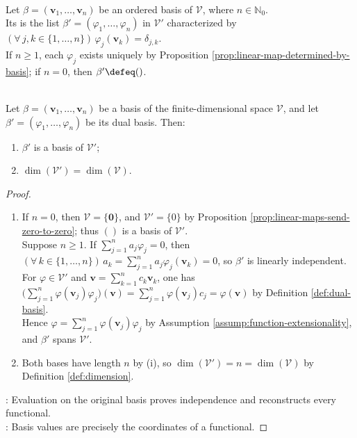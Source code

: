 \begin{definition} \label{def:dual-basis} \\
Let $\beta=(\mathbf{v}_1,\ldots,\mathbf{v}_n)$ be an ordered basis of $\mathcal{V}$, where $n\in\mathbb{N}_0$.\\
Its  is the list $\beta'=(\varphi_1,\ldots,\varphi_n)$ in $\mathcal{V}'$ characterized by $(\forall\,j,k\in\{1,\ldots,n\})\,\varphi_j(\mathbf{v}_k)=\delta_{j,k}$.\\
If $n\geq1$, each $\varphi_j$ exists uniquely by Proposition \ref{prop:linear-map-determined-by-basis}; if $n=0$, then $\beta'\defeq()$.
\end{definition}

\begin{theorem} \label{thm:dual-basis-and-dimension} \\
Let $\beta=(\mathbf{v}_1,\ldots,\mathbf{v}_n)$ be a basis of the finite-dimensional space $\mathcal{V}$, and let $\beta'=(\varphi_1,\ldots,\varphi_n)$ be its dual basis. Then:
\begin{enumerate}[label=(\roman*)]
\setlength{\itemsep}{0pt}
\item $\beta'$ is a basis of $\mathcal{V}'$;
\item $\dim(\mathcal{V}')=\dim(\mathcal{V})$.
\end{enumerate}
\begin{proof}
\begin{enumerate}[label=(\roman*)]
\setlength{\itemsep}{0pt}
\item If $n=0$, then $\mathcal{V}=\{\mathbf{0}\}$, and $\mathcal{V}'=\{0\}$ by Proposition \ref{prop:linear-maps-send-zero-to-zero}; thus $()$ is a basis of $\mathcal{V}'$.\\
Suppose $n\geq1$. If $\sum\limits_{j=1}^{n}a_j\varphi_j=0$, then $(\forall\,k\in\{1,\ldots,n\})\,a_k=\sum\limits_{j=1}^{n}a_j\varphi_j(\mathbf{v}_k)=0$, so $\beta'$ is linearly independent.\\
For $\varphi\in\mathcal{V}'$ and $\mathbf{v}=\sum\limits_{k=1}^{n}c_k\mathbf{v}_k$, one has $\bigl(\sum\limits_{j=1}^{n}\varphi(\mathbf{v}_j)\varphi_j\bigr)(\mathbf{v})=\sum\limits_{j=1}^{n}\varphi(\mathbf{v}_j)c_j=\varphi(\mathbf{v})$ by Definition \ref{def:dual-basis}.\\
Hence $\varphi=\sum\limits_{j=1}^{n}\varphi(\mathbf{v}_j)\varphi_j$ by Assumption \ref{assump:function-extensionality}, and $\beta'$ spans $\mathcal{V}'$.
\item Both bases have length $n$ by (i), so $\dim(\mathcal{V}')=n=\dim(\mathcal{V})$ by Definition \ref{def:dimension}.
\end{enumerate}
: Evaluation on the original basis proves independence and reconstructs every functional.\\
: Basis values are precisely the coordinates of a functional.
\end{proof}
\end{theorem}

